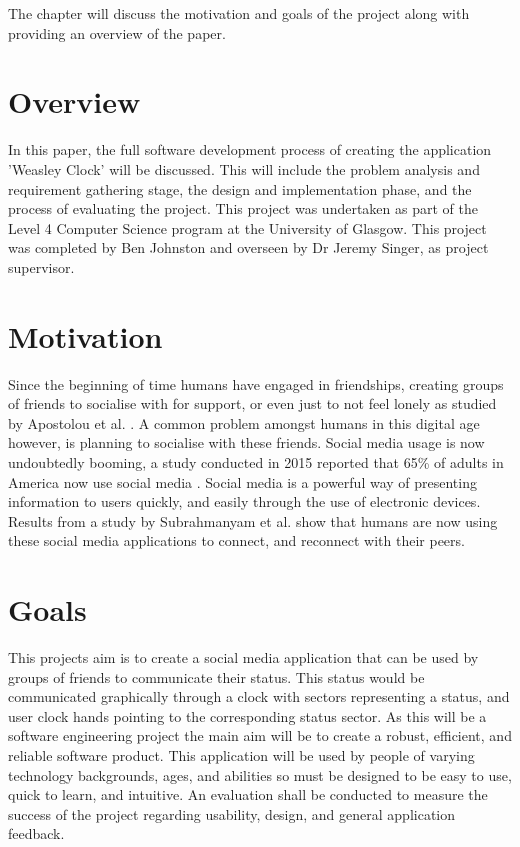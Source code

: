 The chapter will discuss the motivation and goals of the project along with providing an overview of the paper.

\section{Overview}

In this paper, the full software development process of creating the application 'Weasley Clock' will be discussed. This will include the problem analysis and requirement gathering stage, the design and implementation phase, and the process of evaluating the project. This project was undertaken as part of the Level 4 Computer Science program at the University of Glasgow. This project was completed by Ben Johnston and overseen by Dr Jeremy Singer, as project supervisor.

\section{Motivation}
Since the beginning of time humans have engaged in friendships, creating groups of friends to socialise with for support, or even just to not feel lonely as studied by Apostolou et al. \cite{whyFriends}. A common problem amongst humans in this digital age however, is planning to socialise with these friends. \newline\newline
Social media usage is now undoubtedly booming, a study conducted in 2015 reported that 65\% of adults in America now use social media \cite{socialMediaUsage}. Social media is a powerful way of presenting information to users quickly, and easily through the use of electronic devices. Results from a study by Subrahmanyam et al. \cite{SUBRAHMANYAM2008420} show that humans are now using these social media applications to connect, and reconnect with their peers.


\section{Goals}
This projects aim is to create a social media application that can be used by groups of friends to communicate their status. This status would be communicated graphically through a clock with sectors representing a status, and user clock hands pointing to the corresponding status sector. As this will be a software engineering project the main aim will be to create a robust, efficient, and reliable software product. This application will be used by people of varying technology backgrounds, ages, and abilities so must be designed to be easy to use, quick to learn, and intuitive. An evaluation shall be conducted to measure the success of the project regarding usability, design, and general application feedback.